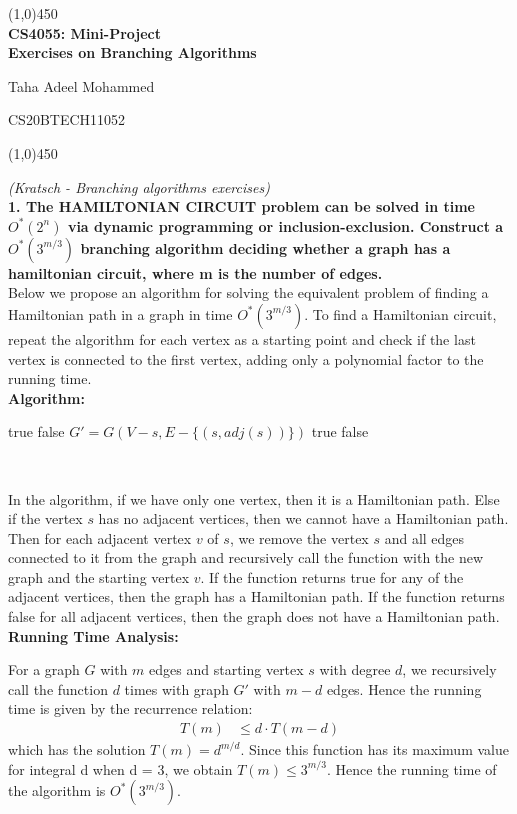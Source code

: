 \documentclass{article}
\renewcommand{\author}{Taha Adeel Mohammed}
\newcommand{\rollnumber}{CS20BTECH11052}
\newcommand{\course}{CS4055: Mini-Project}
\newcommand{\assignment}{Exercises on Branching Algorithms}
\renewcommand{\maketitle}{
	\begin{center}
		\line(1,0){450} \\
		\vspace*{1ex}
        \Large{\textbf{\course}} \\
        \Large{\textbf{\assignment}} \\
    \end{center}
	\large{\author}
	\begin{flushright}
		\vspace*{-5ex}
		\rollnumber \\
	\end{flushright}
	\begin{center}
		\vspace*{-1ex}
		\line(1,0){450}
	\end{center}
}
\begin{document}
\maketitle

\textit{(Kratsch - Branching algorithms exercises)} \\

\noindent
\textbf{1. The HAMILTONIAN CIRCUIT problem can be solved in time $O^*(2^n)$ via dynamic programming or inclusion-exclusion. Construct a $O^*(3^{m/3})$ branching algorithm deciding whether a graph has a hamiltonian circuit, where m is the number of edges. } \\

Below we propose an algorithm for solving the equivalent problem of finding a Hamiltonian path in a graph in time $O^*(3^{m/3})$. To find a Hamiltonian circuit, repeat the algorithm for each vertex as a starting point and check if the last vertex is connected to the first vertex, adding only a polynomial factor to the running time. \\

\noindent
\textbf{Algorithm:}
\begin{algorithmic}[H]
        \Return true 
    \EndIf
        \Return false 
    \EndIf
        \State $G' = G(V - s, E - \{(s, adj(s))\})$
            \State \Return true 
        \EndIf
    \EndFor
    \State \Return false
\end{algorithmic}

\,

In the algorithm, if we have only one vertex, then it is a Hamiltonian path. Else if the vertex $s$ has no adjacent vertices, then we cannot have a Hamiltonian path. Then for each adjacent vertex $v$ of $s$, we remove the vertex $s$ and all edges connected to it from the graph and recursively call the function with the new graph and the starting vertex $v$. If the function returns true for any of the adjacent vertices, then the graph has a Hamiltonian path. If the function returns false for all adjacent vertices, then the graph does not have a Hamiltonian path.\\ 

\noindent
\textbf{Running Time Analysis:}

For a graph $G$ with $m$ edges and starting vertex $s$ with degree $d$, we recursively call the function $d$ times with graph $G'$ with $m - d$ edges. Hence the running time is given by the recurrence relation:
\begin{align*}
    T(m) &\le d \cdot T(m - d)
\end{align*}
which has the solution $T(m) = d ^ {m / d}$. Since this function has its maximum value for integral d when d = 3, we obtain $T(m) \le 3 ^ {m / 3}$. Hence the running time of the algorithm is $O^*(3^{m/3})$.
\end{document}
